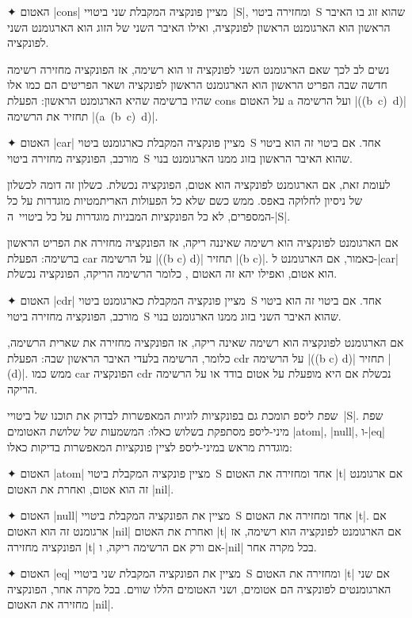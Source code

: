 \begin{enumerate}
  ✦ האטום \T|cons| מציין פונקציה המקבלת שני ביטויי~\E|S|, ומחזירה ביטוי~S
  שהוא זוג בו האיבר הראשון הוא הארגומנט הראשון לפונקציה, ואילו האיבר השני של
  הזוג הוא הארגומנט השני לפונקציה.

  נשים לב לכך שאם הארגומנט השני לפונקציה זו הוא רשימה, אז הפונקציה מחזירה רשימה
  חדשה שבה הפריט הראשון הוא הארגומנט הראשון לפונקציה ושאר הפריטים הם כמו אלו
  שהיו ברשימה שהיא הארגומנט הראשון: הפעלת cons על האטום a ועל הרשימה
  \E|((b~c)~d)| תחזיר את הרשימה \E|(a~(b~c)~d)|.

  ✦ האטום \T|car| מציין פונקציה המקבלת כארגומנט ביטוי~S אחד. אם ביטוי זה הוא
  ביטוי מורכב, הפונקציה מחזירה ביטוי~S שהוא האיבר הראשון בזוג ממנו הארגומנט
  בנוי.

  לעומת זאת, אם הארגומנט לפונקציה הוא אטום, הפונקציה נכשלת. כשלון זה דומה
  לכשלון של ניסיון לחלוקה באפס. ממש כשם שלא כל הפעולות האריתמטיות מוגדרות על כל
  המספרים, לא כל הפונקציות המבניות מוגדרות על כל ביטויי~ה-\E|S|.

  אם הארגומנט לפונקציה הוא רשימה שאיננה ריקה, אז הפונקציה מחזירה את הפריט
  הראשון ברשימה: הפעלת car על הרשימה \E|((b c) d)| תחזיר \E|(b c)|. כאמור, אם
  הארגומנט ל-\E|car| הוא אטום, ואפילו יהא זה האטום , כלומר הרשימה
  הריקה, הפונקציה נכשלת.

  ✦ האטום \T|cdr| מציין פונקציה המקבלת כארגומנט ביטוי~S אחד. אם ביטוי זה הוא
  ביטוי מורכב, הפונקציה מחזירה ביטוי~S שהוא האיבר השני בזוג ממנו הארגומנט בנוי.

  אם הארגומנט לפונקציה הוא רשימה שאינה ריקה, אז הפונקציה מחזירה את שארית
  הרשימה, כלומר, הרשימה בלעדי האיבר הראשון שבה: הפעלת cdr על הרשימה \E|((b c)
  d)| תחזיר \E|(d)|. ממש כמו car הפונקציה cdr נכשלת אם היא מופעלת על אטום בודד
  או על הרשימה הריקה.

\end{enumerate}

שפת ליספ תומכת גם בפונקציות לוגיות המאפשרות לבדוק את תוכנו של ביטויי~\E|S|.
שפת מיני-ליספ מסתפקת בשלוש כאלו: המשמעות של שלושת האטומים \T|atom|, \T|null|,
ו-\T|eq| מוגדרת מראש במיני-ליספ לציין פונקציות המאפשרות בדיקות כאלו:

\begin{enumerate}
  ✦ האטום \T|atom| מציין פונקציה המקבלת ביטוי~S אחד ומחזירה את האטום \T|t| אם
  ארגומנט זה הוא אטום, ואחרת את האטום \T|nil|.

  ✦ האטום \T|null| מציין את הפונקציה המקבלת ביטויי~S אחד ומחזירה את האטום
  \T|t|. אם ארגומנט זה הוא האטום \T|nil| ואחרת את האטום \T|t| אם הארגומנט
  לפונקציה הוא רשימה, אז הפונקציה מחזירה \T|t| אם ורק אם הרשימה ריקה, ו-\T|nil|
  בכל מקרה אחר.

  ✦ האטום \T|eq| מציין את הפונקציה המקבלת שני ביטויי~S ומחזירה את האטום \T|t|
  אם שני הארגומנטים לפונקציה הם אטומים, ושני האטומים הללו שווים. בכל מקרה אחר,
  הפונקציה מחזירה את האטום \T|nil|.
\end{enumerate}

